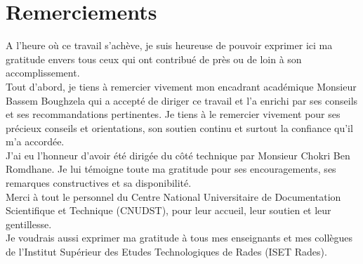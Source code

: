 \documentclass[a4paper, oneside, 12pt, final]{extreport}
\newcommand{\studyDepartment} {%
  CNUDST %
}
\begin{document}
\chapter*{Remerciements}
\thispagestyle{empty}
%
A l'heure où ce travail s'achève, je suis heureuse de pouvoir exprimer ici ma gratitude envers tous ceux qui ont contribué de près ou de loin à son accomplissement.\\
Tout d'abord, je tiens à remercier vivement mon encadrant académique Monsieur Bassem Boughzela qui a accepté de diriger ce travail et l'a enrichi par ses conseils et ses recommandations pertinentes. Je tiens à le remercier vivement pour ses précieux conseils et orientations, son soutien continu et surtout la confiance qu'il m'a accordée.\\
J'ai eu l'honneur d'avoir été dirigée du côté technique par Monsieur Chokri Ben Romdhane. Je lui témoigne toute ma gratitude pour ses encouragements, ses remarques constructives et sa disponibilité.\\
Merci à tout le personnel du  Centre National Universitaire de Documentation Scientifique et
Technique (CNUDST), pour leur accueil, leur soutien et leur gentillesse.\\
Je voudrais aussi exprimer ma gratitude à tous mes enseignants et mes collègues de l'Institut Supérieur des Etudes Technologiques de Rades (ISET Rades).


\end{document}
